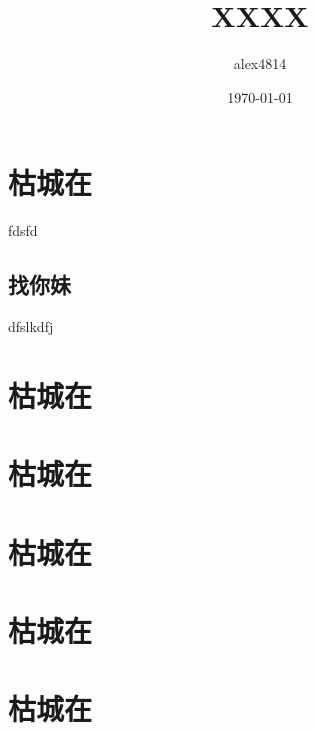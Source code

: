 \documentclass{ctexart}
\begin{document}
\title{XXXX}
\author{alex4814}
\date{\today}
\maketitle


\tableofcontents

\section{枯城在}
fdsfd
    \subsection{找你妹}
    dfslkdfj

\section{枯城在}

\section{枯城在}

\section{枯城在}

\section{枯城在}

\section{枯城在}
\end{document}
